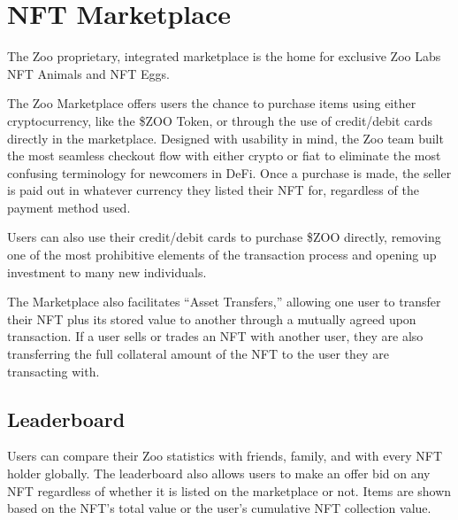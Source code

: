 \section{NFT Marketplace}

The Zoo proprietary, integrated marketplace is the home for exclusive Zoo Labs NFT Animals and NFT Eggs.

The Zoo Marketplace offers users the chance to purchase items using either cryptocurrency, like the \$ZOO Token, or through the use of credit/debit cards directly in the marketplace. Designed with usability in mind, the Zoo team built the most seamless checkout flow with either crypto or fiat to eliminate the most confusing terminology for newcomers in DeFi. Once a purchase is made, the seller is paid out in whatever currency they listed their NFT for, regardless of the payment method used.

Users can also use their credit/debit cards to purchase \$ZOO directly, removing one of the most prohibitive elements of the transaction process and opening up investment to many new individuals.

The Marketplace also facilitates ``Asset Transfers,'' allowing one user to transfer their NFT plus its stored value to another through a mutually agreed upon transaction. If a user sells or trades an NFT with another user, they are also transferring the full collateral amount of the NFT to the user they are transacting with.

\subsection{Leaderboard}

Users can compare their Zoo statistics with friends, family, and with every NFT holder globally. The leaderboard also allows users to make an offer bid on any NFT regardless of whether it is listed on the marketplace or not. Items are shown based on the NFT's total value or the user's cumulative NFT collection value.
